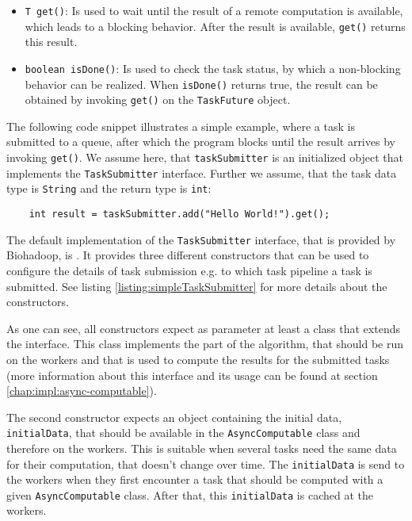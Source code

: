  

  \begin{itemize}
    \item \texttt{T get()}: Is used to wait until the result of a remote computation is available, which leads to a blocking behavior. After the result is available, \texttt{get()} returns this result.
    \item \texttt{boolean isDone()}: Is used to check the task status, by which a non-blocking behavior can be realized. When \texttt{isDone()} returns true, the result can be obtained by invoking \texttt{get()} on the \texttt{TaskFuture} object.
  \end{itemize}

  \noindent
  The following code snippet illustrates a simple example, where a task is submitted to a queue, after which the program blocks until the result arrives by invoking \texttt{get()}. We assume here, that \texttt{taskSubmitter} is an initialized object that implements the \texttt{TaskSubmitter} interface. Further we assume, that the task data type is \texttt{String} and the return type is \texttt{int}:
  \begin{lstlisting}
    int result = taskSubmitter.add("Hello World!").get();
  \end{lstlisting}

  The default implementation of the \texttt{TaskSubmitter} interface, that is provided by Biohadoop, is  . It provides three different constructors that can be used to configure the details of task submission e.g. to which task pipeline a task is submitted. See listing \ref{listing:simpleTaskSubmitter} for more details about the constructors.
  
  
  
  As one can see, all constructors expect as parameter at least a class that extends the  interface. This class implements the part of the algorithm, that should be run on the workers and that is used to compute the results for the submitted tasks (more information about this interface and its usage can be found at section \ref{chap:impl:async-computable}).
  
  The second constructor expects an object containing the initial data, \texttt{initialData}, that should be available in the \texttt{AsyncComputable} class and therefore on the workers. This is suitable when several tasks need the same data for their computation, that doesn't change over time. The \texttt{initialData} is send to the workers when they first encounter a task that should be computed with a given \texttt{AsyncComputable} class. After that, this \texttt{initialData} is cached at the workers.
  
